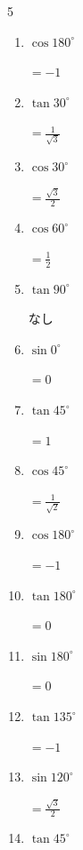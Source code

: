 \begin{multicols}{5}
\begin{enumerate}
  \item $\displaystyle \cos{180^\circ}$

        $\displaystyle =-1$

  \item $\displaystyle \tan{30^\circ}$

        $\displaystyle =\frac{1}{\sqrt{3}}$

\columnbreak %

  \item $\displaystyle \cos{30^\circ}$

        $\displaystyle =\frac{\sqrt{3}}{2}$

  \item $\displaystyle \cos{60^\circ}$

        $\displaystyle =\frac{1}{2}$

  \item $\displaystyle \tan{90^\circ}$

        $\displaystyle なし$

  \item $\displaystyle \sin{0^\circ}$

        $\displaystyle =0$

  \item $\displaystyle \tan{45^\circ}$

        $\displaystyle =1$

  \item $\displaystyle \cos{45^\circ}$

        $\displaystyle =\frac{1}{\sqrt{2}}$

  \item $\displaystyle \cos{180^\circ}$

        $\displaystyle =-1$

  \item $\displaystyle \tan{180^\circ}$

        $\displaystyle =0$

  \item $\displaystyle \sin{180^\circ}$

        $\displaystyle =0$

  \item $\displaystyle \tan{135^\circ}$

        $\displaystyle =-1$

  \item $\displaystyle \sin{120^\circ}$

        $\displaystyle =\frac{\sqrt{3}}{2}$

  \item $\displaystyle \tan{45^\circ}$


\end{enumerate}
\end{multicols}
